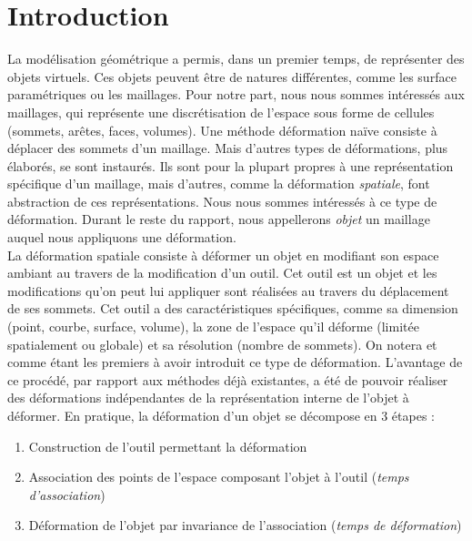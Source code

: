
\chapter{Introduction}

\graphicspath{ {Introduction/IntroductionFigs/PNG/}
  {Introduction/IntroductionFigs/PDF/}
  {Introduction/IntroductionFigs/} }

La modélisation géométrique a permis, dans un premier temps, de représenter des
objets virtuels. Ces objets peuvent être de natures différentes, comme les
surface paramétriques ou les maillages. Pour notre part, nous nous sommes
intéressés aux maillages, qui représente une discrétisation de l'espace sous
forme de cellules (sommets, arêtes, faces, volumes). Une méthode déformation
naïve consiste à déplacer des sommets d'un maillage. Mais d'autres types de
déformations, plus élaborés, se sont instaurés. Ils sont pour la plupart propres
à une représentation spécifique d'un maillage, mais d'autres, comme la
déformation \textit{spatiale}, font abstraction de ces représentations. Nous
nous sommes intéressés à ce type de déformation. Durant le reste du rapport,
nous appellerons \textit{objet} un maillage auquel nous appliquons une
déformation.\\
	
La déformation spatiale consiste à déformer un objet en modifiant son espace
ambiant au travers de la modification d'un outil. Cet outil est un objet et les
modifications qu'on peut lui appliquer sont réalisées au travers du déplacement
de ses sommets. Cet outil a des caractéristiques spécifiques, comme sa dimension
(point, courbe, surface, volume), la zone de l'espace qu'il déforme (limitée
spatialement ou globale) et sa résolution (nombre de sommets). On notera
\cite{Bar84} et \cite{SP86} comme étant les premiers à avoir introduit ce type
de déformation. L'avantage de ce procédé, par rapport aux méthodes déjà
existantes, a été de pouvoir réaliser des déformations indépendantes de la
représentation interne de l'objet à déformer.
\newpage
En pratique, la déformation d'un objet se décompose en 3 étapes :
\begin{enumerate}  

\item Construction de l'outil permettant la déformation

\item Association des points de l'espace composant l'objet à l'outil
(\textit{temps d'association})

\item Déformation de l'objet par invariance de l'association (\textit{temps de
déformation})

\end{enumerate} 

